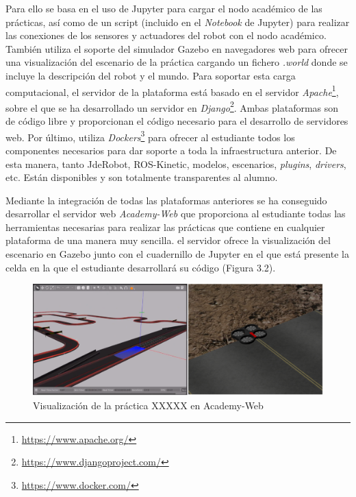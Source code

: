 Para ello se basa en el uso de Jupyter para cargar el nodo académico de las prácticas, así como de un script (incluido en el \textit{Notebook} de Jupyter) para realizar las conexiones de los sensores y actuadores del robot con el nodo académico. También utiliza el soporte del simulador Gazebo en navegadores web para ofrecer una visualización del escenario de la práctica cargando un fichero \textit{.world} donde se incluye la descripción del robot y el mundo. Para soportar esta carga computacional, el servidor de la plataforma está basado en el servidor \textit{Apache}\footnote{\url{https://www.apache.org/}}, sobre el que se ha desarrollado un servidor en  \textit{Django}\footnote{\url{https://www.djangoproject.com/}}. Ambas plataformas son de código libre y proporcionan el código necesario para el desarrollo de servidores web. Por último, utiliza \textit{Dockers}\footnote{\url{https://www.docker.com/}} para ofrecer al estudiante todos los componentes necesarios para dar soporte a toda la infraestructura anterior. De esta manera, tanto JdeRobot, ROS-Kinetic, modelos, escenarios, \textit{plugins}, \textit{drivers}, etc. Están disponibles y son totalmente transparentes al alumno.

Mediante la integración de todas las plataformas anteriores se ha conseguido desarrollar el servidor web \textit{Academy-Web} que proporciona al estudiante todas las herramientas necesarias para realizar las prácticas que contiene en cualquier plataforma de una manera muy sencilla. el servidor ofrece la visualización del escenario en Gazebo junto con el cuadernillo de Jupyter en el que está presente la celda en la que el estudiante desarrollará su código (Figura 3.2).

\begin{figure}[H]
  \begin{center}
    \includegraphics[width=0.9\linewidth]{figures/gazeboworlds.png}
		\caption{Visualización de la práctica XXXXX en Academy-Web}
		\label{fig.academyweb}
		\end{center}
\end{figure}

